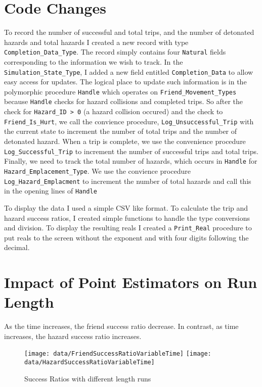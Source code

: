 \documentclass[12pt,letterpaper,titlepage]{article}
\newcommand{\code}[1]{\texttt{#1}}
\begin{document}

\doublespacing

\section{Code Changes}

To record the number of successful and total trips, and the number of
detonated hazards and total hazards I created a new record with type
\code{Completion_Data_Type}.  The record simply contains four
\code{Natural} fields corresponding to the information we wish to
track.  In the \code{Simulation_State_Type}, I added a new field
entitled \code{Completion_Data} to allow easy access for updates.  The
logical place to update such information is in the polymorphic
procedure \code{Handle} which operates on \code{Friend_Movement_Types}
because \code{Handle} checks for hazard collisions and completed
trips.  So after the check for \code{Hazard_ID > 0} (a hazard
collision occured) and the check to \code{Friend_Is_Hurt}, we call the
convience procedure, \code{Log_Unsuccessful_Trip} with the current
state to increment the number of total trips and the number of
detonated hazard.  When a trip is complete, we use the convenience
procedure \code{Log_Successful_Trip} to increment the number of
successful trips and total trips.  Finally, we need to track the total
number of hazards, which occurs in \code{Handle} for
\code{Hazard_Emplacement_Type}.  We use the convience procedure
\code{Log_Hazard_Emplacment} to increment the number of total hazards
and call this in the opening lines of \code{Handle}

To display the data I used a simple CSV like format.  To calculate the
trip and hazard success ratios, I created simple functions to handle
the type conversions and division.  To display the resulting reals I
created a \code{Print_Real} procedure to put reals to the screen
without the exponent and with four digits following the decimal.

\section{Impact of Point Estimators on Run Length}

As the time increases, the friend success ratio decrease.  In
contrast, as time increases, the hazard success ratio increases.

\begin{figure}\centering
  
  \texttt{[image: data/FriendSuccessRatioVariableTime]}
  \texttt{[image: data/HazardSuccessRatioVariableTime]}
  
\caption{Success Ratios with different length runs}
\end{figure}
\end{document}
